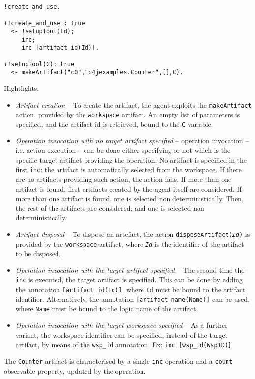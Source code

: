 \documentclass[11pt]{report}
\newcommand\code[1]{{\small{\mbox{\texttt{{#1}}}}}}
\begin{document}
{\small{
\begin{verbatim}
!create_and_use.

+!create_and_use : true
  <- !setupTool(Id);
     inc;
     inc [artifact_id(Id)].

+!setupTool(C): true 
  <- makeArtifact("c0","c4jexamples.Counter",[],C).
\end{verbatim}}}
%
\noindent Hightlights:
%
\begin{itemize}
\item \emph{Artifact creation} -- To create the artifact, the agent exploits the \code{makeArtifact} action,  provided by the \code{workspace} artifact.
%
An empty list of parameters is specified, and the artifact id is retrieved, bound to the \code{C} variable.
%
\item \emph{Operation invocation with no target artifact specified} -- operation invocation -- i.e. action execution -- can be done either specifying or not which is the specific target artifact providing the operation.
%
No artifact is specified in the first \code{inc}:
%
the artifact is automatically selected from the workspace.
%
If there are no artifacts providing such action, the action fails.
%
If more than one artifact is found, first artifacts created by the agent itself are considered. If more than one artifact is found, one is selected non deterministically.
%
Then, the rest of the artifacts are considered, and one is selected non deterministically.
%
\item \emph{Artifact disposal} -- To dispose an artefact, the action \code{disposeArtifact(\emph{Id})} is provided by the \code{workspace} artifact, where  \code{\emph{Id}} is the identifier of the artifact to be disposed.
%
\item \emph{Operation invocation with the target artifact specified} -- The second time the \code{inc} is executed, the target artifact is specified. 
%
This can be done by adding the annotation \code{[artifact\_id(Id)]}, where \code{Id} must be bound to the artifact identifier.
%
Alternatively, the annotation  \code{[artifact\_name(Name)]} can be used, where \code{Name} must be bound to the logic name of the artifact.
%
\item \emph{Operation invocation with the target workspace specified}  -- As a further variant, the workspace identifier can be specified, instead of the target artifact, by means of the \code{wsp\_id} annotation. Ex: \code{inc [wsp\_id(WspID)]}
%
\end{itemize}
%
\noindent The \code{Counter} artifact is characterised by a single \code{inc} operation and a \code{count} observable property, updated by the operation.
\end{document}
